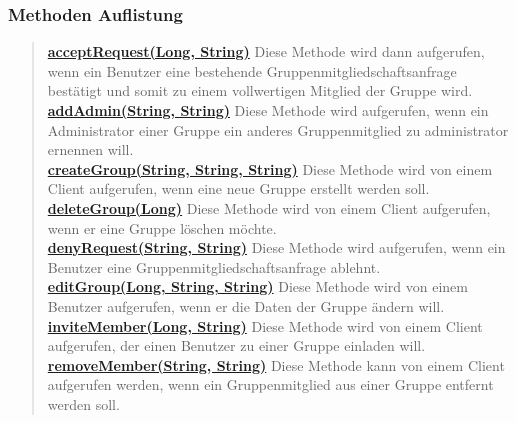 \documentclass[11pt,a4paper]{article}
\begin{document}
{{{{{{{{{{{{{{{{{{{\subsubsection{Methoden Auflistung}{
\begin{verse}
\hyperlink{edu.kit.pse17.go_app.ClientCommunication.Upstream.GroupRestController.acceptRequest(java.lang.Long, java.lang.String)}{{\bf acceptRequest(Long, String)}} Diese Methode wird dann aufgerufen, wenn ein Benutzer eine bestehende Gruppenmitgliedschaftsanfrage bestätigt und somit zu einem vollwertigen Mitglied der Gruppe wird.\\
\hyperlink{edu.kit.pse17.go_app.ClientCommunication.Upstream.GroupRestController.addAdmin(java.lang.String, java.lang.String)}{{\bf addAdmin(String, String)}} Diese Methode wird aufgerufen, wenn ein Administrator einer Gruppe ein anderes Gruppenmitglied zu administrator ernennen will.\\
\hyperlink{edu.kit.pse17.go_app.ClientCommunication.Upstream.GroupRestController.createGroup(java.lang.String, java.lang.String, java.lang.String)}{{\bf createGroup(String, String, String)}} Diese Methode wird von einem Client aufgerufen, wenn eine neue Gruppe erstellt werden soll.\\
\hyperlink{edu.kit.pse17.go_app.ClientCommunication.Upstream.GroupRestController.deleteGroup(java.lang.Long)}{{\bf deleteGroup(Long)}} Diese Methode wird von einem Client aufgerufen, wenn er eine Gruppe löschen möchte.\\
\hyperlink{edu.kit.pse17.go_app.ClientCommunication.Upstream.GroupRestController.denyRequest(java.lang.String, java.lang.String)}{{\bf denyRequest(String, String)}} Diese Methode wird aufgerufen, wenn ein Benutzer eine Gruppenmitgliedschaftsanfrage ablehnt.\\
\hyperlink{edu.kit.pse17.go_app.ClientCommunication.Upstream.GroupRestController.editGroup(java.lang.Long, java.lang.String, java.lang.String)}{{\bf editGroup(Long, String, String)}} Diese Methode wird von einem Benutzer aufgerufen, wenn er die Daten der Gruppe ändern will.\\
\hyperlink{edu.kit.pse17.go_app.ClientCommunication.Upstream.GroupRestController.inviteMember(java.lang.Long, java.lang.String)}{{\bf inviteMember(Long, String)}} Diese Methode wird von einem Client aufgerufen, der einen Benutzer zu einer Gruppe einladen will.\\
\hyperlink{edu.kit.pse17.go_app.ClientCommunication.Upstream.GroupRestController.removeMember(java.lang.String, java.lang.String)}{{\bf removeMember(String, String)}} Diese Methode kann von einem Client aufgerufen werden, wenn ein Gruppenmitglied aus einer Gruppe entfernt werden soll.\\
\end{verse}
}
}}}}}}}}}}}}}}}}}}}
\end{document}
